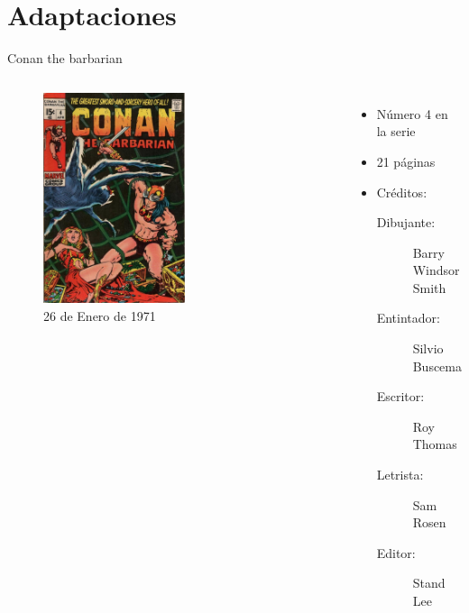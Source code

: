 \section{Adaptaciones}

\begin{frame}{Conan the barbarian}
\begin{columns}
    \begin{figure}[htb]
    \centering
        \includegraphics[width=0.55\textwidth]{img/TheBarbarian004Portada}
        \caption{26 de Enero de 1971}
    \end{figure}
    \begin{itemize}
         \item Número 4 en la serie
         \item 21 páginas
         \item Créditos:
         \begin{description}
            \item[Dibujante:] Barry Windsor Smith
            \item[Entintador:] Silvio  Buscema
            \item[Escritor:] Roy Thomas
            \item[Letrista:] Sam Rosen
            \item[Editor:] Stand Lee
         \end{description}
    \end{itemize}
\end{columns}
\end{frame}
